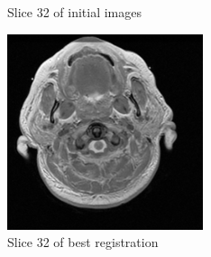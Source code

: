 \documentclass[11pt,english]{article}
\begin{document}
\begin{figure}[h!]
\begin{minipage}[b]{0.22\textwidth}
        \caption{Slice 32 of initial images}
        \label{fig:initiallastOverlap}
      \end{minipage}
    \begin{minipage}[b]{0.22\textwidth}
      \includegraphics[width = \textwidth]{images/lastTranslation.PNG}
      \caption{Slice 32 of best registration}
      \label{fig:versorlastLBFGS}
    \end{minipage}
  \end{figure}
\printbibliography
\end{document}
